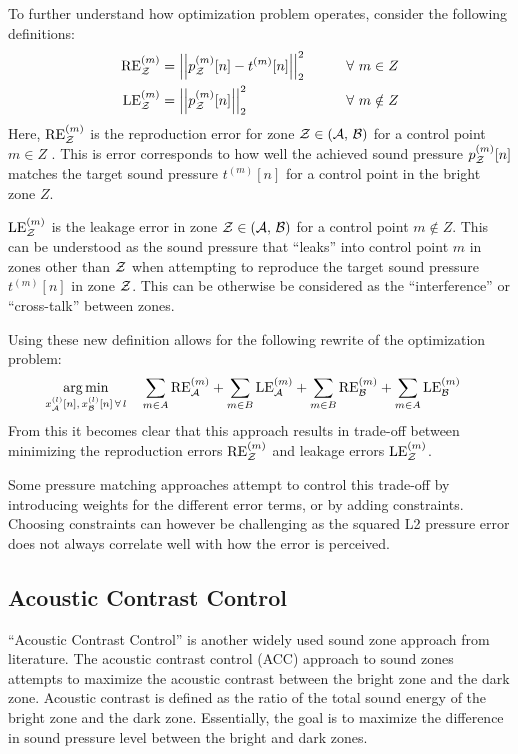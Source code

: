 To further understand how optimization problem operates, consider the following definitions: 
\begin{alignat}{2}
    \text{RE}^{(m)}_\zz &= \norm[2][2]{p_\zz^{(m)}[n] - t^{(m)}[n]} \qquad&& \forall\,\, m\in Z \label{eq:sound_zone:approaches:RE}\\
    \text{LE}^{(m)}_\zz &= \norm[2][2]{p_\zz^{(m)}[n]} \qquad&& \forall\,\, m\notin Z \label{eq:sound_zone:approaches:LE} 
\end{alignat}
Here, $\text{RE}^{(m)}_{\mathcal{Z}}$ is the reproduction error for zone $\mathcal{Z} \in \left(\mathcal{A},\,\mathcal{B}\right)$ for a control point $m \in Z$ .
This is error corresponds to how well the achieved sound pressure $p_{\mathcal{Z}}^{(m)}[n]$ matches the target sound pressure $t^{(m)}[n]$ for a control point in the 
bright zone $Z$. 

$\text{LE}^{(m)}_{\mathcal{Z}}$ is the leakage error in zone $\mathcal{Z} \in \left(\mathcal{A},\,\mathcal{B}\right)$ for a control point $m \notin Z$.
This can be understood as the sound pressure that ``leaks'' into control point $m$ in zones other than $\mathcal{Z}$ when attempting to 
reproduce the target sound pressure $t^{(m)}[n]$ in zone $\mathcal{Z}$. 
This can be otherwise be considered as the ``interference'' or ``cross-talk'' between zones.

Using these new definition allows for the following rewrite of the optimization problem:
\begin{align}
    \argmin{x_\za^{(l)}[n],\,x_\zb^{(l)}[n]\,\forall\,l}{
       &\sum_{m\in A} \text{RE}^{(m)}_\za +  \sum_{m\in B} \text{LE}^{(m)}_\za + \sum_{m\in B} \text{RE}^{(m)}_\zb + \sum_{m\in A} \text{LE}^{(m)}_\zb
    }
\end{align}
From this it becomes clear that this approach results in trade-off between minimizing the reproduction errors $\text{RE}^{(m)}_{\mathcal{Z}}$ 
and leakage errors $\text{LE}^{(m)}_{\mathcal{Z}}$. 

Some pressure matching approaches attempt to control this trade-off by introducing weights for the different error terms, 
or by adding constraints.
Choosing constraints can however be challenging as the squared L2 pressure error does not always correlate well with how
the error is perceived.

\subsection{Acoustic Contrast Control}
\label{ch:sound_zone:approaches:acoustic_contrast_control}
``Acoustic Contrast Control'' is another widely used sound zone approach from literature.
The acoustic contrast control (ACC) approach to sound zones attempts to maximize the acoustic contrast between the bright zone and the dark zone. 
Acoustic contrast is defined as the ratio of the total sound energy of the bright zone and the dark zone.
Essentially, the goal is to maximize the difference in sound pressure level between the bright and dark zones.

